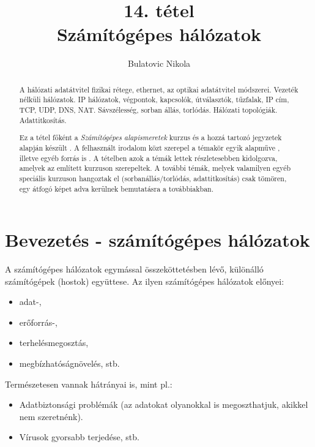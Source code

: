 \documentclass[12pt]{article}
\theoremstyle{plain}
\begin{document}
\title{14. tétel \\ Számítógépes hálózatok}
\author{Bulatovic Nikola}

\maketitle


\begin{abstract}
    A hálózati adatátvitel fizikai rétege, ethernet, az optikai adatátvitel módszerei. Vezeték nélküli hálózatok. IP hálózatok, végpontok, kapcsolók, útválasztók, tűzfalak, IP cím, TCP, UDP, DNS, NAT. Sávszélesség, sorban állás, torlódás. Hálózati topológiák. Adattitkosítás. \par
    Ez a tétel főként a \textit{Számítógépes alapismeretek} kurzus és a hozzá tartozó jegyzetek alapján készült \cite{szamalap1, szamalap2}. A felhasznált irodalom közt szerepel a témakör egyik alapműve \cite{tanenbaum}, illetve egyéb forrás is \cite{magyar}. A tételben azok a témák lettek részletesebben kidolgozva, amelyek az említett kurzuson szerepeltek. A további témák, melyek valamilyen egyéb speciális kurzuson hangoztak el (sorbanállás/torlódás, adattitkosítás) csak tömören, egy átfogó képet adva kerülnek bemutatásra a továbbiakban. 

\end{abstract}

\vfill

\tableofcontents

\newpage

\section{Bevezetés - számítógépes hálózatok}

A számítógépes hálózatok egymással összeköttetésben lévő, különálló számítógépek (hostok) együttese. Az ilyen számítógépes hálózatok előnyei:
\begin{itemize}
\setlength\itemsep{-0.2em}
    \item adat-,
    \item erőforrás-,
    \item terhelésmegosztás, 
    \item megbízhatóságnövelés, stb.
\end{itemize}{}
Természetesen vannak hátrányai is, mint pl.:
\begin{itemize}
\setlength\itemsep{-0.2em}
    \item Adatbiztonsági problémák (az adatokat olyanokkal is megoszthatjuk, akikkel nem szeretnénk).
    \item Vírusok gyorsabb terjedése, stb.
\end{itemize}{}
\end{document}
